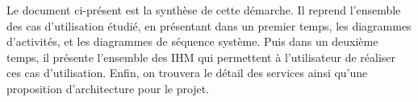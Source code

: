 Le document ci-présent est la synthèse de cette démarche. Il reprend l'ensemble des cas d'utilisation étudié, en présentant dans un premier temps, les diagrammes d'activités, et les diagrammes de séquence système. Puis dans un deuxième temps, il présente l'ensemble des IHM qui permettent à l'utilisateur de réaliser ces cas d'utilisation. Enfin, on trouvera le détail des services ainsi qu'une proposition d'architecture pour le projet.












